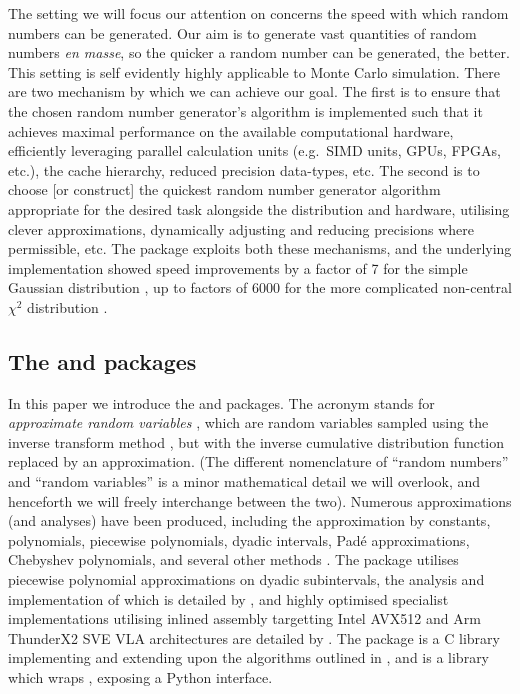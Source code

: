 The setting we will focus our attention on concerns the speed with which random numbers can be generated. Our aim is to generate vast quantities of random numbers \textit{en masse}, so the quicker a random number can be generated, the better. This setting is self evidently highly applicable to Monte Carlo simulation. There are two mechanism by which we can achieve our goal. The first is to ensure that the chosen random number generator's algorithm is implemented such that it achieves maximal performance on the available computational hardware, efficiently leveraging parallel calculation units (e.g.\ SIMD units, GPUs, FPGAs, etc.), the cache hierarchy, reduced precision data-types, etc. The second is to choose [or construct] the quickest random number generator algorithm appropriate for the desired task alongside the distribution and hardware, utilising clever approximations, dynamically adjusting and reducing precisions where permissible, etc. The \arv package exploits both these mechanisms, and the underlying implementation showed speed improvements by a factor of 7 for the simple Gaussian distribution \citep[\S\,3.4]{giles2024rounding}, up to factors of \qty{6000}{} for the more complicated non-central \( \chi^2 \) distribution \citep[p.\,26:22, tab.\,5(b)]{giles2024rounding}. 

\subsection{The \arv and \pyarv packages}

In this paper we introduce the \arv and \pyarv packages. The acronym \arv stands for \textit{approximate random variables} \citep[\S,2]{giles2023approximating}, which are random variables sampled using the inverse transform method \citep[\S\,2.2.1]{glasserman2003monte}, but with the inverse cumulative distribution function replaced by an approximation. (The different nomenclature of ``random numbers'' and ``random variables'' is a minor mathematical detail we will overlook, and henceforth we will freely interchange between the two).  Numerous approximations (and analyses) have been produced, including the approximation by constants, polynomials, piecewise polynomials, dyadic intervals, Pad\'{e} approximations, Chebyshev polynomials, and several other methods \citep{sheridan2020nested,giles2023approximating,cheung2007hardware,blair1976rational_chebyshev,hastings1955approximations}. The \arv package utilises piecewise polynomial approximations on dyadic subintervals, the analysis and implementation of which is detailed by \citet{giles2023approximating}, and highly optimised specialist implementations utilising inlined assembly targetting Intel AVX512 and Arm ThunderX2 SVE VLA architectures are detailed by \citet[\S\,4.3.3]{sheridan2020nested}. The \arv package is a C library implementing and extending upon the algorithms outlined in \citep{giles2023approximating}, and \pyarv is a library which wraps \arv, exposing a Python interface. 

